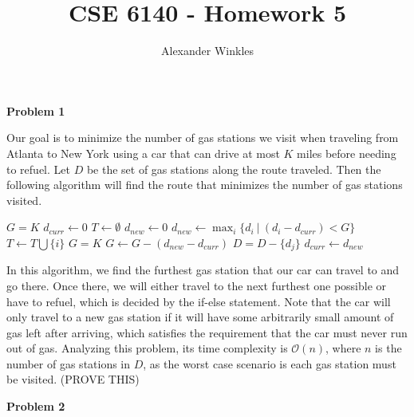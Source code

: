 \documentclass{article}
\title{CSE 6140 - Homework 5}
\author{Alexander Winkles}
\date{}
\newcommand{\Problem}[1]{\textbf{\large Problem #1}}
\begin{document}
\maketitle

\vspace{2in}



\newpage

\Problem{1}

Our goal is to minimize the number of gas stations we visit when traveling from Atlanta to New York using a car that can drive at most $K$ miles before needing to refuel. 
Let $D$ be the set of gas stations along the route traveled. 
Then the following algorithm will find the route that minimizes the number of gas stations visited. 

\begin{algorithm}[H]
\begin{algorithmic}[1]
\State $G = K$ 
\State $d_{curr} \gets 0$ 
\State $T \gets \emptyset$ 
 
\State $d_{new} \gets 0$
\State $d_{new} \gets \displaystyle\max_i \{d_i\ |\ (d_i - d_{curr}) < G\}$ 
 
\State $T \gets T \bigcup \{i\}$ 
\State $G = K$ 
\Else {}
\State $G \gets G - (d_{new} - d_{curr})$ 
 
\State $D = D - \{d_j\}$
\EndFor
\State $d_{curr} \gets d_{new}$ 
\EndIf
\EndWhile
\State {}
\EndProcedure
\end{algorithmic}
\end{algorithm}

In this algorithm, we find the furthest gas station that our car can travel to and go there.
Once there, we will either travel to the next furthest one possible or have to refuel, which is decided by the if-else statement. 
Note that the car will only travel to a new gas station if it will have some arbitrarily small amount of gas left after arriving, which satisfies the requirement that the car must never run out of gas. 
Analyzing this problem, its time complexity is $\mathcal{O}(n)$, where $n$ is the number of gas stations in $D$, as the worst case scenario is each gas station must be visited. 
(PROVE THIS)

\Problem{2}
\end{document}
